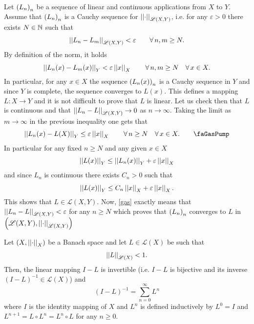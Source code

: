 \documentclass{article}
\begin{document}
\begin{fancyproof}
	Let ${\left({L}_{n}\right)}_{n}$ be a sequence of linear and continuous applications from $X$ to $Y$. Assume that ${\left({L}_{n}\right)}_{n}$ is a Cauchy sequence for $\left|\left|\cdot\right|\right|_{\mathscr{L}(X,Y)}$, i.e. for any $\varepsilon>0$ there exists $N\in\mathbb{N}$ such that
	\begin{equation*}
		\left|\left|L_{n}-L_{m}\right|\right|_{\mathscr{L}(X,Y)}<\varepsilon\qquad \forall\, n,m\geq N.
	\end{equation*}
	By definition of the norm, it holds 
	\begin{equation*}
		\left|\left|L_{n}(x)-L_{m}(x)\right|\right|_{Y}<\varepsilon\left|\left|x\right|\right|_{X}\qquad\forall\, n,m\geq  N\quad\forall\, x\in X.
	\end{equation*}
	In particular, for any $x\in X$ the sequence ${\left(L_{n}(x)\right)}_{n}$ is a Cauchy sequence in $Y$ and since $Y$ is complete, the sequence converges to $L(x)$. This defines a mapping $L:X\to Y$ and it is not difficult to prove that $L$ is linear. Let us check then that $L$ is continuous and that $\left|\left|L_{n}-L\right|\right|_{\mathscr{L}(X,Y)}\to0$ as $n\to\infty$. Taking the limit as $m\to\infty$ in the previous inequality one gets that 
	\begin{equation*}
		\norm{L_{n}(x)-L(X)}_{Y}\leq\varepsilon\norm{x}_{X}\qquad\every n\geq N\quad\every x\in X.\tag*{\faGasPump}\label{gas}
	\end{equation*}
	In particular for any fixed $n\geq N$ and any given $x\in X$
	\begin{equation*}
		\left|\left|L(x)\right|\right|_{Y}\leq\left|\left|L_{n}(x)\right|\right|_{Y}+\varepsilon\left|\left|x\right|\right|_{X}
	\end{equation*}
	and since $L_{n}$ is continuous there exists $C_{n}>0$ such that
	\begin{equation*}
		\left|\left|L(x)\right|\right|_{Y}\leq C_{n}\left|\left|x\right|\right|_{X}+\varepsilon\left|\left|x\right|\right|_{X}.
	\end{equation*}
	This shows that $L\in\mathscr{L}(X,Y)$. Now, \ref{gas} exactly means that $\left|\left|L_{n}-L\right|\right|_{\mathscr{L}(X,Y)}<\varepsilon$ for any $n\geq N$ which proves that ${\left({L}_{n}\right)}_{n}$ converges to $L$ in $\left(\mathscr{L}(X,Y),\left|\left|\cdot\right|\right|_{\mathscr{L}(X,Y)}\right)$
\end{fancyproof}
\begin{corollary}
	Let $\left(X,\left|\left|\cdot\right|\right|_{X}\right)$ be a Banach space and let $L\in\mathscr{L}(X)$ be such that
	\begin{equation*}
		\left|\left|L\right|\right|_{\mathscr{L}(X)}<1.
	\end{equation*}
	Then, the linear mapping $I-L$ is invertible (i.e. $I-L$ is bijective and its inverse $(I-L)^{-1}\in\mathscr{L}(X)$) and
	\begin{equation*}
		(I-L)^{-1}=\sum_{n=0}^{\infty}L^{n}
	\end{equation*}
	where $I$ is the identity mapping of $X$ and $L^{n}$ is defined inductively by $L^{0}=I$ and $L^{n+1}=L\circ L^{n}=L^{n}\circ L$ for any $n\geq 0$.
\end{corollary}
\end{document}
